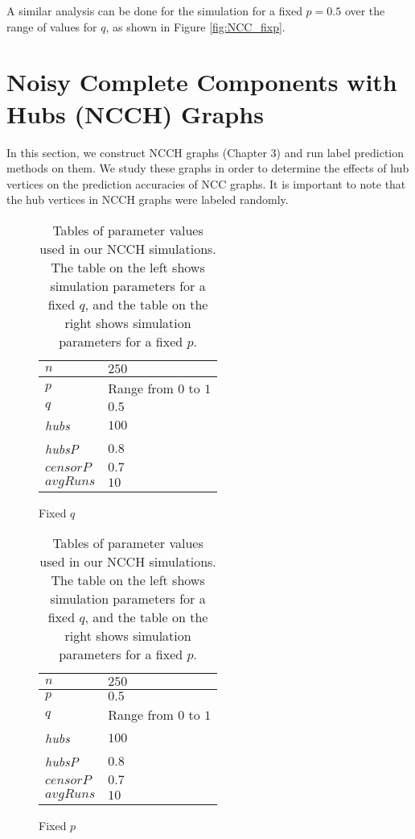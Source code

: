 A similar analysis can be done for the simulation for a fixed $p=0.5$ over
the range of values for $q$, as shown in Figure \ref{fig:NCC_fixp}.


\section{Noisy Complete Components with Hubs (NCCH) Graphs}
In this section, we construct NCCH graphs (Chapter 3) and run label 
prediction methods on them. We study these graphs in order to determine the
effects of hub vertices on the prediction accuracies of NCC graphs. It is
important to note that the hub vertices in NCCH graphs were labeled 
randomly.

\begin{table}[H]
\centering
\begin{subfigure}[h]{0.4\linewidth}
\begin{tabular}{|l|l|}
\hline
$n$ & $250$ \\ \hline
$p$ & Range from $0$ to $1$\\ \hline
$q$ & $0.5$\\ \hline
\textit{hubs} & $100$\\ \hline
\textit{hubsP} & $0.8$\\ \hline
$censorP$ & $0.7$\\ \hline
$avgRuns$ & $10$\\ \hline
\end{tabular}
\caption{Fixed $q$}
\end{subfigure}
\hfill
\begin{subfigure}[h]{0.4\linewidth}
\begin{tabular}{|l|l|}
\hline
$n$ & $250$ \\ \hline
$p$ & $0.5$\\ \hline
$q$ & Range from $0$ to $1$\\ \hline
\textit{hubs} & $100$\\ \hline
\textit{hubsP} & $0.8$\\ \hline
$censorP$ & $0.7$\\ \hline
$avgRuns$ & $10$\\ \hline
\end{tabular}
\caption{Fixed $p$}
\end{subfigure}%
\caption{Tables of parameter values used in our NCCH simulations. The table
on the left shows simulation parameters for a fixed $q$, and the table on
the right shows simulation parameters for a fixed $p$.}
\label{table:NCCH-params}
\end{table}

